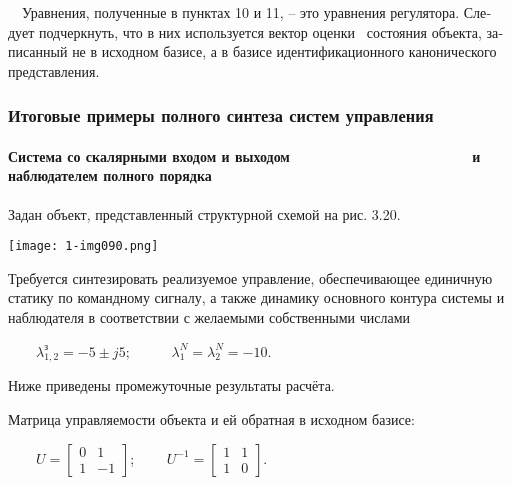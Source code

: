 \documentclass[a4paper]{article}
\begin{document}
{\begin{russian}\sffamily
\ \ Уравнения, полученные в пунктах 10 и 11, – это уравнения регулятора. Следует подчеркнуть, что в них используется
вектор оценки \ состояния объекта, записанный не в исходном базисе, а в базисе идентификационного канонического
представления.
\end{russian}}


\bigskip

\subsubsection[Итоговые примеры полного синтеза систем управления]{Итоговые примеры полного синтеза систем управления}
\hypertarget{RefHeadingToc455659757}{}\paragraph[Система со скалярными входом и выходом
\ \ \ \ \ \ \ \ \ \ \ \ \ \ \ \ \ \ \ \ \ \ и наблюдателем полного порядка]{Система со скалярными входом и выходом
\ \ \ \ \ \ \ \ \ \ \ \ \ \ \ \ \ \ \ \ \ \ и наблюдателем полного порядка}
{\begin{russian}\sffamily
Задан объект, представленный структурной схемой на рис. 3.20.
\end{russian}}

{\centering  \texttt{[image: 1-img090.png]} \par}
{\begin{russian}\sffamily
Требуется синтезировать реализуемое управление, обеспечивающее единичную статику по командному сигналу, а также динамику
основного контура системы и наблюдателя в соответствии с желаемыми собственными числами
\end{russian}}

{\begin{russian}\sffamily
\ \ \ \  $λ_{1,2}^з=-5\pm \mathit{j5};$ \ \ \ \ \  $λ_1^N=λ_2^N=-10.$
\end{russian}}

{\begin{russian}\sffamily
Ниже приведены промежуточные результаты расчёта.
\end{russian}}

{\begin{russian}\sffamily
Матрица управляемости объекта и ей обратная в исходном базисе:
\end{russian}}

{\begin{russian}\sffamily
\ \ \ \  $U=\left[\begin{matrix}0&1\\1&-1\end{matrix}\right]$; \ \ \ \ 
$U^{-1}=\left[\begin{matrix}1&1\\1&0\end{matrix}\right]$.
\end{russian}}
\end{document}
